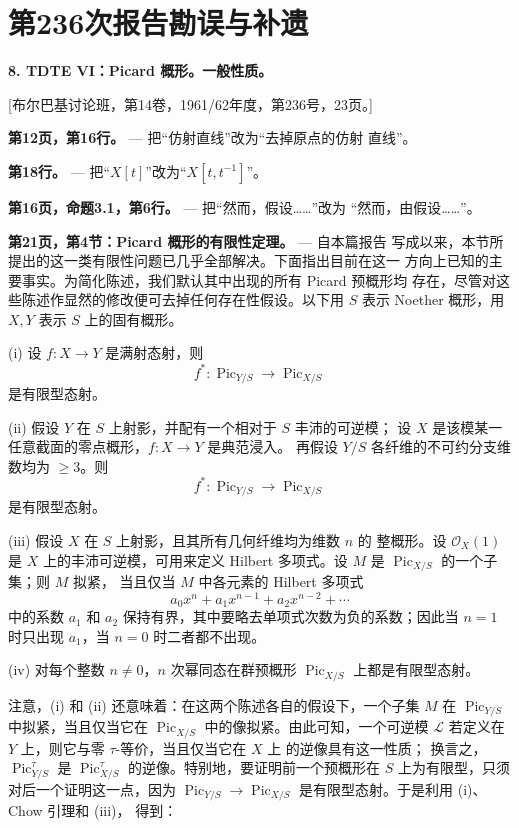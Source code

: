 \clearpage
\chapter*{第236次报告勘误与补遗}

\noindent\textbf{8. TDTE VI：Picard 概形。一般性质。}

\begin{center}
[布尔巴基讨论班，第14卷，1961/62年度，第236号，23页。]
\end{center}

\noindent\textbf{第12页，第16行。} --- 把“仿射直线”改为“去掉原点的仿射
直线”。

\noindent\textbf{第18行。} --- 把“$X[t]$”改为“$X[t,t^{-1}]$”。

\noindent\textbf{第16页，命题3.1，第6行。} --- 把“然而，假设……”改为
“然而，由假设……”。

\noindent\textbf{第21页，第4节：Picard 概形的有限性定理。} --- 自本篇报告
写成以来，本节所提出的这一类有限性问题已几乎全部解决。下面指出目前在这一
方向上已知的主要事实。为简化陈述，我们默认其中出现的所有 Picard 预概形均
存在，尽管对这些陈述作显然的修改便可去掉任何存在性假设。以下用 $S$ 表示
Noether 概形，用 $X,Y$ 表示 $S$ 上的固有概形。

\medskip
\noindent(i) 设 $f:X\longrightarrow Y$ 是满射态射，则
\[
f^*: \operatorname{Pic}_{Y/S}\longrightarrow\operatorname{Pic}_{X/S}
\]
是有限型态射。

\noindent(ii) 假设 $Y$ 在 $S$ 上射影，并配有一个相对于 $S$ 丰沛的可逆模；
设 $X$ 是该模某一任意截面的零点概形，$f:X\longrightarrow Y$ 是典范浸入。
再假设 $Y/S$ 各纤维的不可约分支维数均为 $\geq3$。则
\[
f^*: \operatorname{Pic}_{Y/S}\longrightarrow\operatorname{Pic}_{X/S}
\]
是有限型态射。

\noindent(iii) 假设 $X$ 在 $S$ 上射影，且其所有几何纤维均为维数 $n$ 的
整概形。设 $\mathcal O_X(1)$ 是 $X$ 上的丰沛可逆模，可用来定义 Hilbert
多项式。设 $M$ 是 $\operatorname{Pic}_{X/S}$ 的一个子集；则 $M$ 拟紧，
当且仅当 $M$ 中各元素的 Hilbert 多项式
\[
a_0x^n+a_1x^{n-1}+a_2x^{n-2}+\cdots
\]
中的系数 $a_1$ 和 $a_2$ 保持有界，其中要略去单项式次数为负的系数；因此当 $n=1$ 时只出现 $a_1$，当 $n=0$ 时二者都不出现。

\noindent(iv) 对每个整数 $n\neq0$，$n$ 次幂同态在群预概形
$\operatorname{Pic}_{X/S}$ 上都是有限型态射。

注意，(i) 和 (ii) 还意味着：在这两个陈述各自的假设下，一个子集 $M$ 在
$\operatorname{Pic}_{Y/S}$ 中拟紧，当且仅当它在
$\operatorname{Pic}_{X/S}$ 中的像拟紧。由此可知，一个可逆模
$\mathcal L$ 若定义在 $Y$ 上，则它与零 $\tau$-等价，当且仅当它在 $X$ 上
的逆像具有这一性质；
换言之，$\operatorname{Pic}_{Y/S}^\tau$ 是
$\operatorname{Pic}_{X/S}^\tau$ 的逆像。特别地，要证明前一个预概形在
$S$ 上为有限型，只须对后一个证明这一点，因为
$\operatorname{Pic}_{Y/S}\longrightarrow
\operatorname{Pic}_{X/S}$ 是有限型态射。于是利用 (i)、Chow 引理和 (iii)，
得到：

